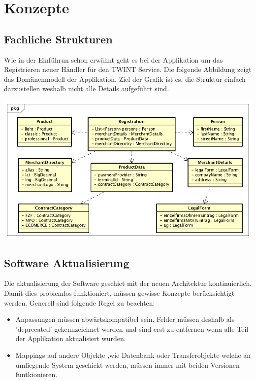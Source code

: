 \graphicspath{{./images/}}

\chapter{Konzepte}

\section{Fachliche Strukturen}

Wie in der Einführun schon erwähnt geht es bei der Applikation um das Registrieren neuer Händler für den TWINT Service. Die folgende Abbildung zeigt das Domänenmodell der Applikation. Ziel der Grafik ist es, die Struktur einfach darzustellen weshalb nicht alle Details aufgeführt sind. 

\begin{center}
	\includegraphics[scale=0.6]{DomainModel.png}
\end{center}

\section{Software Aktualisierung}
\label{software-update}

Die aktualisierung der Software geschiet mit der neuen Architektur kontinuierlich. Damit dies problemlos funktioniert, müssen gewisse Konzepte berücksichtigt werden. Generell sind folgende Regel zu beachten:
\begin{itemize}
	\item Anpassungen müssen abwärtskompatibel sein. Felder müssen deshalb als 'deprecated' gekennzeichnet werden und sind erst zu entfernen wenn alle Teil der Applikation aktualisiert wurden.
	\item Mappings auf andere Objekte ,wie Datenbank oder Transferobjekte welche an umliegende System geschickt werden, müssen immer mit beiden Versionen funtkionieren.
\end{itemize}

